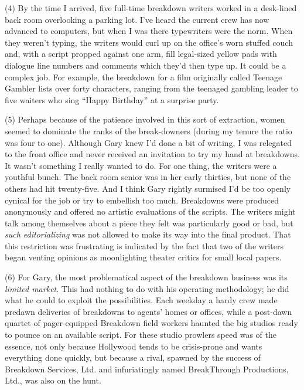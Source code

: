 \documentclass[UTF8,11pt]{ctexart}
\begin{document}
(4) By the time I arrived, five full-time breakdown writers worked in a desk-lined back room overlooking a parking lot. I’ve heard the current crew has now advanced to computers, but when I was there typewriters were the norm. When they weren’t typing, the writers would curl up on the office’s worn stuffed couch and, with a script propped against one arm, fill legal-sized yellow pads with dialogue line numbers and comments which they’d then type up. It could be a complex job. For example, the breakdown for a film originally called Teenage Gambler lists over forty characters, ranging from the teenaged gambling leader to five waiters who sing “Happy Birthday” at a surprise party.


(5) Perhaps because of the patience involved in this sort of extraction, women seemed to dominate the ranks of the break-downers (during my tenure the ratio was four to one). Although Gary knew I’d done a bit of writing, I was relegated to the front office and never received an invitation to try my hand at breakdowns. It wasn’t something I really wanted to do. For one thing, the writers were a youthful bunch. The back room senior was in her early thirties, but none of the others had hit twenty-five. And I think Gary rightly surmised I’d be too openly cynical for the job or try to embellish too much. Breakdowns were produced anonymously and offered no artistic evaluations of the scripts. The writers might talk among themselves about a piece they felt was particularly good or bad, but \textit{such editorializing} was not allowed to make its way into the final product. That this restriction was frustrating is indicated by the fact that two of the writers began venting opinions as moonlighting theater critics for small local papers.


(6) For Gary, the most problematical aspect of the breakdown business was its \textit{limited market}. This had nothing to do with his operating methodology; he did what he could to exploit the possibilities. Each weekday a hardy crew made predawn deliveries of breakdowns to agents’ homes or offices, while a post-dawn quartet of pager-equipped Breakdown field workers haunted the big studios ready to pounce on an available script. For these studio prowlers speed was of the essence, not only because Hollywood tends to be crisis-prone and wants everything done quickly, but because a rival, spawned by the success of Breakdown Services, Ltd. and infuriatingly named BreakThrough Productions, Ltd., was also on the hunt.
\end{document}
